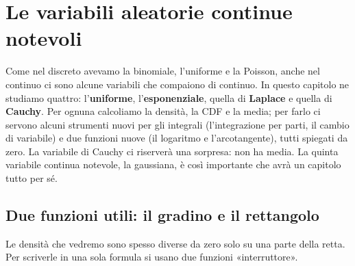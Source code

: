 \chapter{Le variabili aleatorie continue notevoli}

Come nel discreto avevamo la binomiale, l'uniforme e la Poisson, anche nel continuo ci sono alcune variabili che
compaiono di continuo. In questo capitolo ne studiamo quattro: l'\textbf{uniforme}, l'\textbf{esponenziale}, quella
di \textbf{Laplace} e quella di \textbf{Cauchy}. Per ognuna calcoliamo la densità, la CDF e la media; per farlo ci
servono alcuni strumenti nuovi per gli integrali (l'integrazione per parti, il cambio di variabile) e due funzioni
nuove (il logaritmo e l'arcotangente), tutti spiegati da zero. La variabile di Cauchy ci riserverà una sorpresa: non ha
media. La quinta variabile continua notevole, la gaussiana, è così importante che avrà un capitolo tutto per sé.

\section{Due funzioni utili: il gradino e il rettangolo}

Le densità che vedremo sono spesso diverse da zero solo su una parte della retta. Per scriverle in una sola formula
si usano due funzioni «interruttore».

